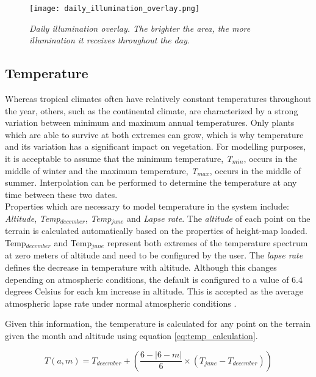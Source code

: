 \begin{figure}
\center
	\texttt{[image: daily\_illumination\_overlay.png]}
	\caption{ \textit{Daily illumination overlay. The brighter the area, the more illumination it receives throughout the day.} }
	\label{fig:overlay_daily_illumination}
\end{figure}

\subsection{Temperature}

Whereas tropical climates often have relatively constant temperatures throughout the year, others, such as the continental climate, are characterized by a strong variation between minimum and maximum annual temperatures. Only plants which are able to survive at both extremes can grow, which is why temperature and its variation has a significant impact on vegetation. For modelling purposes, it is acceptable to assume that the minimum temperature, \textit{T$_{min}$}, occurs in the middle of winter and the maximum temperature, \textit{T$_{max}$}, occurs in the middle of summer. Interpolation can be performed to determine the temperature at any time between these two dates.\\

Properties which are necessary to model temperature in the system include: \textit{Altitude}, \textit{Temp$_{december}$}, \textit{Temp$_{june}$} and \textit{Lapse rate}. The \textit{altitude} of each point on the terrain is calculated automatically based on the properties of height-map loaded. Temp$_{december}$ and Temp$_{june}$ represent both extremes of the temperature spectrum at zero meters of altitude and need to be configured by the user. The \textit{lapse rate} defines the decrease in temperature with altitude. Although this changes depending on atmospheric conditions, the default is configured to a value of 6.4 degrees Celsius for each km increase in altitude. This is accepted as the average atmospheric lapse rate under normal atmospheric conditions \protect\footnotemark.\\

Given this information, the temperature is calculated for any point on the terrain given the month and altitude using equation \ref{eq:temp_calculation}. 

\begin{equation} \label{eq:temp_calculation}
	T(a,m) = T_{december} + ( \frac{6 - |6-m|}{6} \times (T_{june} - T_{december}))
\end{equation}

